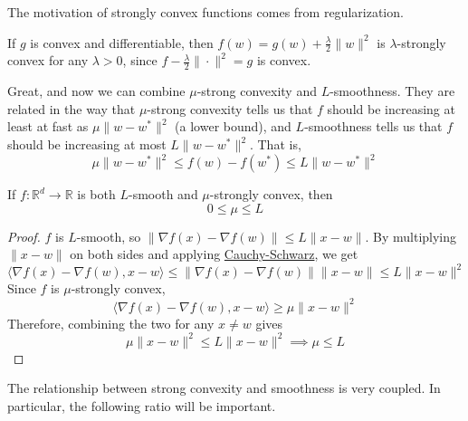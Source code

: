 	The motivation of strongly convex functions comes from regularization. 

	\begin{example}
		If $g$ is convex and differentiable, then $f(w) = g(w) + \frac{\lambda}{2}\|w\|^2$ is $\lambda$-strongly convex for any $\lambda > 0$, since $f - \frac{\lambda}{2}\|\cdot\|^2 = g$ is convex. 
	\end{example}

	Great, and now we can combine $\mu$-strong convexity and $L$-smoothness. They are related in the way that $\mu$-strong convexity tells us that $f$ should be increasing at least at fast as $\mu \|w - w^\ast\|^2$ (a lower bound), and $L$-smoothness tells us that $f$ should be increasing at most $L \|w - w^\ast\|^2$. That is, 
	\begin{equation}
	  \mu \|w - w^\ast\|^2 \leq f(w) - f(w^\ast) \leq L \|w - w^\ast\|^2
	\end{equation}
	
	\begin{lemma}
	  \label{thm:l-smooth-and-mu-strongly-convex}
	  If $f: \mathbb{R}^d \to \mathbb{R}$ is both $L$-smooth and $\mu$-strongly convex, then 
		\begin{equation}
		  0 \leq \mu \leq L
		\end{equation}
	\end{lemma}
	\begin{proof}
	  $f$ is $L$-smooth, so $\|\nabla f(x) - \nabla f(w) \| \leq L \|x - w\|$. By multiplying $\|x - w\|$ on both sides and applying \hyperref[lin-thm:cauchy-schwarz-inequality]{Cauchy-Schwarz}, we get 
		\begin{equation}
		  \langle \nabla f(x) - \nabla f(w), x - w \rangle \leq \| \nabla f(x) - \nabla f(w)\| \|x - w\| \leq L\|x - w\|^2 
		\end{equation}
		Since $f$ is $\mu$-strongly convex, 
		\begin{equation}
		  \langle \nabla f(x) - \nabla f(w), x - w \rangle  \geq \mu \|x - w\|^2 
		\end{equation}
		Therefore, combining the two for any $x \neq w$ gives 
		\begin{equation}
		  \mu\|x - w\|^2 \leq L \|x - w\|^2 \implies \mu \leq L
		\end{equation}
	\end{proof}

	The relationship between strong convexity and smoothness is very coupled. In particular, the following ratio will be important. 


